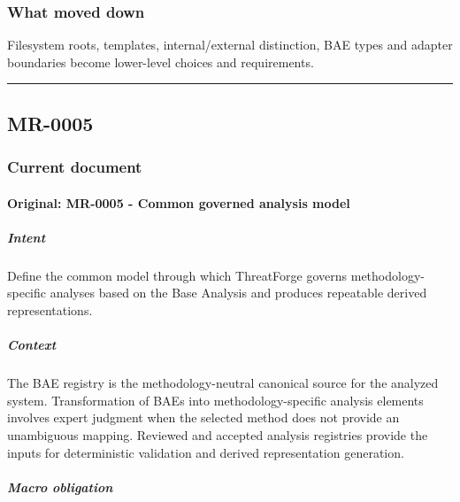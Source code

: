 \documentclass[
  10pt,
]{article}
\begin{document}
\subsubsection{What moved down}\label{what-moved-down-2}

Filesystem roots, templates, internal/external distinction, BAE types
and adapter boundaries become lower-level choices and requirements.

\begin{center}\rule{0.5\linewidth}{0.5pt}\end{center}

\subsection{MR-0005}\label{mr-0005}

\subsubsection{Current document}\label{current-document-4}

\paragraph{Original: MR-0005 - Common governed analysis
model}\label{original-mr-0005---common-governed-analysis-model}

\subparagraph{Intent}\label{intent-9}

Define the common model through which ThreatForge governs
methodology-specific analyses based on the Base Analysis and produces
repeatable derived representations.

\subparagraph{Context}\label{context-9}

The BAE registry is the methodology-neutral canonical source for the
analyzed system. Transformation of BAEs into methodology-specific
analysis elements involves expert judgment when the selected method does
not provide an unambiguous mapping. Reviewed and accepted analysis
registries provide the inputs for deterministic validation and derived
representation generation.

\subparagraph{Macro obligation}\label{macro-obligation-4}
\end{document}
